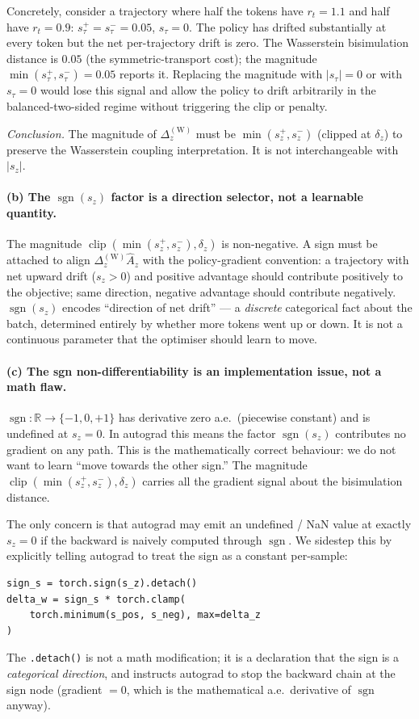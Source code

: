 \documentclass{article}
\DeclareMathOperator*{\clip}{clip}
\begin{document}
Concretely, consider a trajectory where half the tokens have
$r_t=1.1$ and half have $r_t=0.9$: $s_\tau^+=s_\tau^-=0.05$,
$s_\tau=0$. The policy has drifted substantially at every token but the
net per-trajectory drift is zero. The Wasserstein bisimulation distance
is $0.05$ (the symmetric-transport cost); the magnitude
$\min(s_\tau^+,s_\tau^-) = 0.05$ reports it. Replacing the magnitude with
$|s_\tau| = 0$ or with $s_\tau = 0$ would lose this signal and allow the
policy to drift arbitrarily in the balanced-two-sided regime without
triggering the clip or penalty.

\emph{Conclusion.} The magnitude of $\Delta_z^{(\text{W})}$ must be
$\min(s_z^+,s_z^-)$ (clipped at $\delta_z$) to preserve the Wasserstein
coupling interpretation. It is not interchangeable with $|s_z|$.

\paragraph{(b) The $\operatorname{sgn}(s_z)$ factor is a direction selector, not a learnable quantity.}
The magnitude $\clip(\min(s_z^+,s_z^-),\delta_z)$ is non-negative. A
sign must be attached to align $\Delta_z^{(\text{W})} \hat A_z$ with
the policy-gradient convention: a trajectory with net upward drift
($s_z>0$) and positive advantage should contribute positively to the
objective; same direction, negative advantage should contribute
negatively. $\operatorname{sgn}(s_z)$ encodes ``direction of net drift''
--- a \emph{discrete} categorical fact about the batch, determined
entirely by whether more tokens went up or down. It is not a continuous
parameter that the optimiser should learn to move.

\paragraph{(c) The sgn non-differentiability is an implementation issue, not a math flaw.}
$\operatorname{sgn}:\mathbb R\to\{-1,0,+1\}$ has derivative zero
a.e.\ (piecewise constant) and is undefined at $s_z=0$. In autograd this
means the factor $\operatorname{sgn}(s_z)$ contributes no gradient on any
path. This is the mathematically correct behaviour: we do not want to
learn ``move towards the other sign.'' The magnitude
$\clip(\min(s_z^+,s_z^-),\delta_z)$ carries all the gradient signal
about the bisimulation distance.

The only concern is that autograd may emit an undefined / NaN value at
exactly $s_z=0$ if the backward is naively computed through
$\operatorname{sgn}$. We sidestep this by explicitly telling autograd to
treat the sign as a constant per-sample:
\begin{verbatim}
sign_s = torch.sign(s_z).detach()
delta_w = sign_s * torch.clamp(
    torch.minimum(s_pos, s_neg), max=delta_z
)
\end{verbatim}
The \verb|.detach()| is not a math modification; it is a declaration
that the sign is a \emph{categorical direction}, and instructs autograd
to stop the backward chain at the sign node (gradient $=0$, which is
the mathematical a.e.\ derivative of $\operatorname{sgn}$ anyway).
\end{document}
